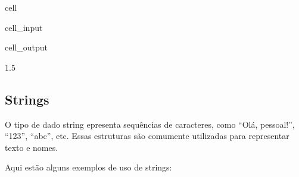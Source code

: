 \documentclass[letterpaper,10pt,english]{jupyterBook}
\begin{document}
\begin{sphinxuseclass}{cell}\begin{sphinxVerbatimInput}

\begin{sphinxuseclass}{cell_input}
\begin{sphinxVerbatim}[commandchars=\\\{\}]
  

  

  
\end{sphinxVerbatim}

\end{sphinxuseclass}\end{sphinxVerbatimInput}
\begin{sphinxVerbatimOutput}

\begin{sphinxuseclass}{cell_output}
\begin{sphinxVerbatim}[commandchars=\\\{\}]
1.5
\end{sphinxVerbatim}

\end{sphinxuseclass}\end{sphinxVerbatimOutput}

\end{sphinxuseclass}

\subsection{Strings}
\label{\detokenize{chapters/ch2/ch2:strings}}
\sphinxAtStartPar
O tipo de dado string epresenta sequências de caracteres, como “Olá, pessoal!”, “123”, “abc”, etc. Essas estruturas são comumente utilizadas para representar texto e nomes.

\sphinxAtStartPar
Aqui estão alguns exemplos de uso de strings:
\end{document}
